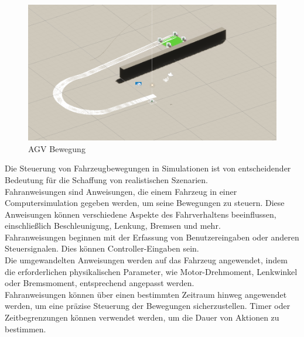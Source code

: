 \begin{figure}[htp]
    \centering
    \includegraphics[width=(\textwidth)]{images/AGV_bewegt_sich.PNG}
    \caption{AGV Bewegung}
    \label{AGV Bewegung}
\end{figure}
Die Steuerung von Fahrzeugbewegungen in Simulationen ist von entscheidender Bedeutung für die Schaffung von realistischen Szenarien.\\

Fahranweisungen sind Anweisungen, die einem Fahrzeug in einer Computersimulation gegeben werden, um seine Bewegungen zu steuern. Diese Anweisungen können verschiedene Aspekte des Fahrverhaltens beeinflussen, einschließlich Beschleunigung, Lenkung, Bremsen und mehr. \\

Fahranweisungen beginnen mit der Erfassung von Benutzereingaben oder anderen Steuersignalen. Dies können Controller-Eingaben sein.\\

Die umgewandelten Anweisungen werden auf das Fahrzeug angewendet, indem die erforderlichen physikalischen Parameter, wie Motor-Drehmoment, Lenkwinkel oder Bremsmoment, entsprechend angepasst werden.\\

Fahranweisungen können über einen bestimmten Zeitraum hinweg angewendet werden, um eine präzise Steuerung der Bewegungen sicherzustellen. Timer oder Zeitbegrenzungen können verwendet werden, um die Dauer von Aktionen zu bestimmen.\\

